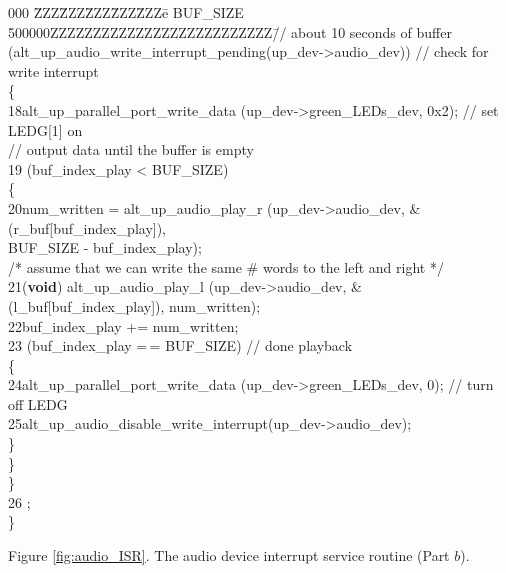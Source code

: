 \documentclass[11pt, twoside, pdftex]{article}
\begin{document}
\begin{table}
\begin{center}
\begin{minipage}[t]{12.5 cm}
\begin{tabbing}
000 \=ZZZ\=ZZZ\=ZZZ\=ZZZ\=ZZZ\=e  BUF\_SIZE 500000ZZZZZZZZZZZZZZZZZZZZZZZZZZ\=// about 10 seconds of buffer \> (alt\_up\_audio\_write\_interrupt\_pending(up\_dev->audio\_dev))	\>\>\>\>\>// check for
write interrupt\\
\>\>\{\\
18\>\>\>alt\_up\_parallel\_port\_write\_data (up\_dev->green\_LEDs\_dev, 0x2); \>\>\>\>// set LEDG[1] on\\
\>\>\>// output data until the buffer is empty \\
19\>\> (buf\_index\_play < BUF\_SIZE)\\
\>\>\>\{\\
20\>\>\>\>num\_written = alt\_up\_audio\_play\_r (up\_dev->audio\_dev, \&(r\_buf[buf\_index\_play]), \\
\>\>\>\>\>BUF\_SIZE - buf\_index\_play);\\
\>\>\>\>/* assume that we can write the same \# words to the left and right */\\
21\>\>\>\>({\bf void}) alt\_up\_audio\_play\_l (up\_dev->audio\_dev, \&(l\_buf[buf\_index\_play]), num\_written);\\
22\>\>\>\>buf\_index\_play += num\_written;\\
 
23\>\>\> (buf\_index\_play =$\,$= BUF\_SIZE) \>\>\>// done playback\\
\>\>\>\>\{\\
24\>\>\>\>\>alt\_up\_parallel\_port\_write\_data (up\_dev->green\_LEDs\_dev, 0); \>\>// turn off LEDG\\
25\>\>\>\>\>alt\_up\_audio\_disable\_write\_interrupt(up\_dev->audio\_dev);\\
\>\>\>\>\}\\
\>\>\>\}\\
\>\>\}\\
26 \>;\\
\>\}
 
\>\>\>\>Figure \ref{fig:audio_ISR}. The audio device interrupt service routine (Part $b$).
\end{tabbing}
\end{minipage}
\end{center}
\end{table}
\end{document}
